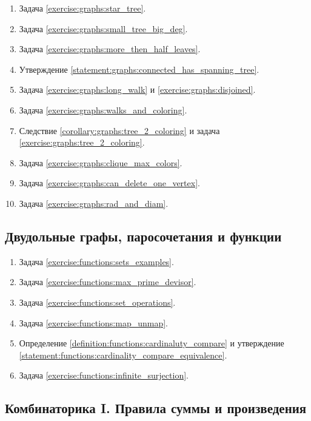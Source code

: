 \begin{enumerate}[label=\textbf{№\arabic*}:]
    \item Задача \ref{exercise:graphs:star_tree}.
    \item Задача \ref{exercise:graphs:small_tree_big_deg}.
    \item Задача \ref{exercise:graphs:more_then_half_leaves}.
    \item Утверждение \ref{statement:graphs:connected_has_spanning_tree}.
    \item Задача \ref{exercise:graphs:long_walk} и \ref{exercise:graphs:disjoined}.
    \item Задача \ref{exercise:graphs:walks_and_coloring}.
    \item Следствие \ref{corollary:graphs:tree_2_coloring} и задача \ref{exercise:graphs:tree_2_coloring}.
    \item Задача \ref{exercise:graphs:clique_max_colors}.
    \item Задача \ref{exercise:graphs:can_delete_one_vertex}.
    \item Задача \ref{exercise:graphs:rad_and_diam}.
\end{enumerate}

\subsection*{Двудольные графы, паросочетания и функции}

\begin{enumerate}[label=\textbf{№\arabic*}:]
    \item Задача \ref{exercise:functions:sets_examples}.
    \item Задача \ref{exercise:functions:max_prime_devisor}.
    \item Задача \ref{exercise:functions:set_operations}.
    \item Задача \ref{exercise:functions:map_unmap}.
    \item Определение \ref{definition:functions:cardinaluty_compare} и утверждение \ref{statement:functions:cardinality_compare_equivalence}.
    \item Задача \ref{exercise:functions:infinite_surjection}.
\end{enumerate}

\subsection*{Комбинаторика I. Правила суммы и произведения}

